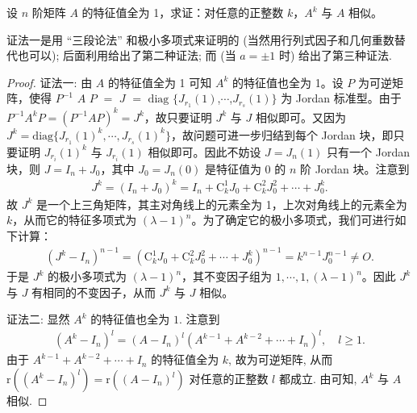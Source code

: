 \documentclass[../../main.tex]{subfiles}
\begin{document}
\begin{proposition}\label{example:特征值全为1矩阵的任意幂次于原矩阵相似}
设 \(n\) 阶矩阵 \(A\) 的特征值全为 1，求证：对任意的正整数 \(k\)，\(A^k\) 与 \(A\) 相似。
\end{proposition}
\begin{remark}
{\color{blue}证法一}是用 “三段论法” 和极小多项式来证明的 (当然用行列式因子和几何重数替代也可以); 后面利用给出了第二种证法; 而 (当 $a = \pm 1$ 时) 给出了第三种证法. 
\end{remark}
\begin{proof}
{\color{blue}证法一:}
由 \(A\) 的特征值全为 1 可知 \(A^k\) 的特征值也全为 1。设 \(P\) 为可逆矩阵，使得 $P^{-1}$ $A$ $P$ $=$ $J$ $=$ $\mathrm{diag}$ $\{J_{r_1}(1)$,$\cdots$,$J_{r_s}(1)\}$ 为 Jordan 标准型。由于 \(P^{-1}A^kP=(P^{-1}AP)^k = J^k\)，故只要证明 \(J^k\) 与 \(J\) 相似即可。又因为 \(J^k=\mathrm{diag}\{J_{r_1}(1)^k,\cdots,J_{r_s}(1)^k\}\)，故问题可进一步归结到每个 Jordan 块，即只要证明 \(J_{r_i}(1)^k\) 与 \(J_{r_i}(1)\) 相似即可。因此不妨设 \(J = J_n(1)\) 只有一个 Jordan 块，则 \(J = I_n+J_0\)，其中 \(J_0 = J_n(0)\) 是特征值为 0 的 \(n\) 阶 Jordan 块。注意到
\begin{align*}
J^k=(I_n + J_0)^k
=I_n + \mathrm{C}_k^1J_0 + \mathrm{C}_k^2J_0^2+\cdots+J_0^k.
\end{align*}
故 \(J^k\) 是一个上三角矩阵，其主对角线上的元素全为 1，上次对角线上的元素全为 \(k\)，从而它的特征多项式为 \((\lambda - 1)^n\)。为了确定它的极小多项式，我们可进行如下计算：
\begin{align*}
(J^k - I_n)^{n - 1}=(\mathrm{C}_k^1J_0 + \mathrm{C}_k^2J_0^2+\cdots+J_0^k)^{n - 1}
=k^{n - 1}J_0^{n - 1}\neq O.
\end{align*}
于是 \(J^k\) 的极小多项式为 \((\lambda - 1)^n\)，其不变因子组为 \(1,\cdots,1,(\lambda - 1)^n\)。因此 \(J^k\) 与 \(J\) 有相同的不变因子，从而 \(J^k\) 与 \(J\) 相似。

{\color{blue}证法二:}
显然 $A^k$ 的特征值也全为 $1$. 注意到
\begin{align*}
(A^k - I_n)^l = (A - I_n)^l(A^{k - 1} + A^{k - 2} + \cdots + I_n)^l, \quad l \geqslant  1.
\end{align*}
由于 $A^{k - 1} + A^{k - 2} + \cdots + I_n$ 的特征值全为 $k$, 故为可逆矩阵, 从而 $\mathrm{r}((A^k - I_n)^l) = \mathrm{r}((A - I_n)^l)$ 对任意的正整数 $l$ 都成立. 由可知, $A^k$ 与 $A$ 相似. 
\end{proof}
\end{document}
